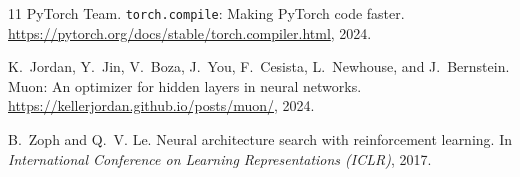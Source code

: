 \documentclass[11pt]{article}
\begin{document}
\begin{thebibliography}{11}
{PyTorch Team}.
\newblock \texttt{torch.compile}: Making {PyTorch} code faster.
\newblock \url{https://pytorch.org/docs/stable/torch.compiler.html}, 2024.

K.~Jordan, Y.~Jin, V.~Boza, J.~You, F.~Cesista, L.~Newhouse, and J.~Bernstein.
\newblock Muon: An optimizer for hidden layers in neural networks.
\newblock \url{https://kellerjordan.github.io/posts/muon/}, 2024.

B.~Zoph and Q.~V. Le.
\newblock Neural architecture search with reinforcement learning.
\newblock In \emph{International Conference on Learning Representations ({ICLR})}, 2017.

\end{thebibliography}
\end{document}
